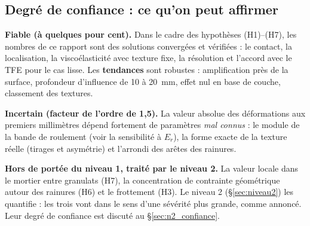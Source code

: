\subsection{Degré de confiance : ce qu'on peut affirmer}
\begin{encadre}
\textbf{Fiable (à quelques pour cent).} Dans le cadre des hypothèses (H1)--(H7), les nombres de ce
rapport sont des solutions convergées et vérifiées : le contact, la localisation, la
viscoélasticité avec texture fixe, la résolution et l'accord avec le TFE pour le cas lisse. Les
\textbf{tendances} sont robustes : amplification près de la surface, profondeur d'influence de
10 à \SI{20}{mm}, effet nul en base de couche, classement des textures.

\textbf{Incertain (facteur de l'ordre de 1,5).} La valeur absolue des déformations aux premiers
millimètres dépend fortement de paramètres \emph{mal connus} : le module de la bande de roulement
(voir la sensibilité à $E_r$), la forme exacte de la texture réelle (tirages et asymétrie) et
l'arrondi des arêtes des rainures.

\textbf{Hors de portée du niveau 1, traité par le niveau 2.} La valeur locale dans le mortier
entre granulats (H7), la concentration de contrainte géométrique autour des rainures (H6) et le
frottement (H3). Le niveau 2 (\S\ref{sec:niveau2}) les quantifie : les trois vont dans le sens
d'une sévérité plus grande, comme annoncé. Leur degré de confiance est discuté au
\S\ref{sec:n2_confiance}.
\end{encadre}
